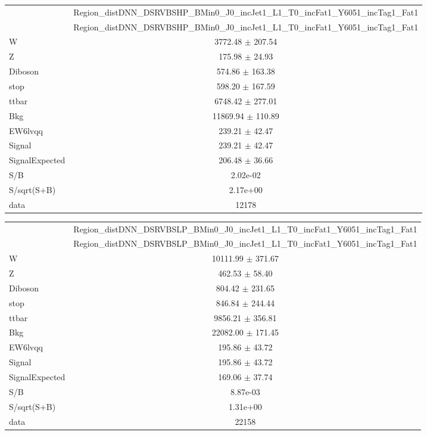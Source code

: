 \documentclass{article}
\begin{document}
\begin{table}
\centering
\small
\begin{tabular}{l|c|}
\cline{2-2}
 & \multicolumn{1}{c|}{Region\_distDNN\_DSRVBSHP\_BMin0\_J0\_incJet1\_L1\_T0\_incFat1\_Y6051\_incTag1\_Fat1}\\
\cline{2-2}
 & \multicolumn{1}{c|}{Region\_distDNN\_DSRVBSHP\_BMin0\_J0\_incJet1\_L1\_T0\_incFat1\_Y6051\_incTag1\_Fat1}\\ \hline
W & 3772.48 $\pm$ 207.54\\
Z & 175.98 $\pm$ 24.93\\
Diboson & 574.86 $\pm$ 163.38\\
stop & 598.20 $\pm$ 167.59\\
ttbar & 6748.42 $\pm$ 277.01\\
\hline
Bkg & 11869.94 $\pm$ 110.89\\
\hline
EW6lvqq & 239.21 $\pm$ 42.47\\
\hline
Signal & 239.21 $\pm$ 42.47\\
SignalExpected & 206.48 $\pm$ 36.66\\
\hline
S/B & 2.02e-02\\
S/sqrt(S+B) & 2.17e+00\\
\hline
data & 12178\\ \hline
\end{tabular}
\end{table}


\begin{table}
\centering
\small
\begin{tabular}{l|c|}
\cline{2-2}
 & \multicolumn{1}{c|}{Region\_distDNN\_DSRVBSLP\_BMin0\_J0\_incJet1\_L1\_T0\_incFat1\_Y6051\_incTag1\_Fat1}\\
\cline{2-2}
 & \multicolumn{1}{c|}{Region\_distDNN\_DSRVBSLP\_BMin0\_J0\_incJet1\_L1\_T0\_incFat1\_Y6051\_incTag1\_Fat1}\\ \hline
W & 10111.99 $\pm$ 371.67\\
Z & 462.53 $\pm$ 58.40\\
Diboson & 804.42 $\pm$ 231.65\\
stop & 846.84 $\pm$ 244.44\\
ttbar & 9856.21 $\pm$ 356.81\\
\hline
Bkg & 22082.00 $\pm$ 171.45\\
\hline
EW6lvqq & 195.86 $\pm$ 43.72\\
\hline
Signal & 195.86 $\pm$ 43.72\\
SignalExpected & 169.06 $\pm$ 37.74\\
\hline
S/B & 8.87e-03\\
S/sqrt(S+B) & 1.31e+00\\
\hline
data & 22158\\ \hline
\end{tabular}
\end{table}
\end{document}
